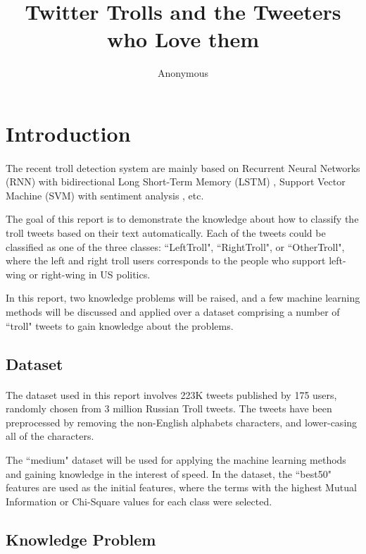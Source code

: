 \documentclass[11pt]{article}
\title{Twitter Trolls and the Tweeters who Love them}
\author
{Anonymous}
\begin{document}
\maketitle

\section{Introduction}

\paragraph{} The recent troll detection system are mainly based on Recurrent Neural Networks (RNN) with bidirectional Long Short-Term Memory (LSTM) \cite{cuestadetecting}, Support Vector Machine (SVM) with sentiment analysis \cite{seah2015troll}, etc.

The goal of this report is to demonstrate the knowledge about how to classify the troll tweets based on their text automatically. Each of the tweets could be classified as one of the three classes: ``LeftTroll", ``RightTroll", or ``OtherTroll", where the left and right troll users corresponds to the people who support left-wing or right-wing in US politics.

In this report, two knowledge problems will be raised, and a few machine learning methods will be discussed and applied over a dataset comprising a number of ``troll" tweets to gain knowledge about the problems.

\subsection{Dataset}
\paragraph{}
The dataset used in this report involves 223K tweets published by 175 users, randomly chosen from 3 million Russian Troll tweets. \cite{boatwrighttroll} The tweets have been preprocessed by removing the non-English alphabets characters, and lower-casing all of the characters.

The ``medium" dataset will be used for applying the machine learning methods and gaining knowledge in the interest of speed. In the dataset, the ``best50" features are used as the initial features, where the terms with the highest Mutual Information or Chi-Square values for each class were selected.

\subsection{Knowledge Problem}
\end{document}

